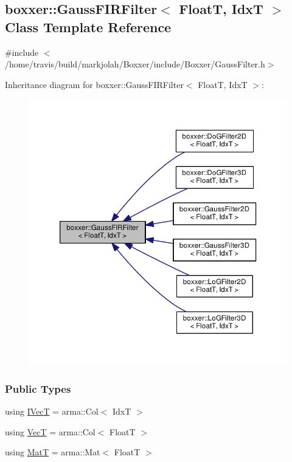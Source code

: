 \hypertarget{classboxxer_1_1GaussFIRFilter}{}\subsection{boxxer\+:\+:Gauss\+F\+I\+R\+Filter$<$ FloatT, IdxT $>$ Class Template Reference}
\label{classboxxer_1_1GaussFIRFilter}


{\ttfamily \#include $<$/home/travis/build/markjolah/\+Boxxer/include/\+Boxxer/\+Gauss\+Filter.\+h$>$}



Inheritance diagram for boxxer\+:\+:Gauss\+F\+I\+R\+Filter$<$ FloatT, IdxT $>$\+:\nopagebreak
\begin{figure}[H]
\begin{center}
\leavevmode
\includegraphics[width=333pt]{classboxxer_1_1GaussFIRFilter__inherit__graph}
\end{center}
\end{figure}
\subsubsection*{Public Types}
\begin{DoxyCompactItemize}
\item 
using \hyperlink{classboxxer_1_1GaussFIRFilter_a0083c8c9ab6032dd458b4dc93852c2b8}{I\+VecT} = arma\+::\+Col$<$ IdxT $>$
\item 
using \hyperlink{classboxxer_1_1GaussFIRFilter_aafe2049df690ad8c3617c39810e78bbe}{VecT} = arma\+::\+Col$<$ FloatT $>$
\item 
using \hyperlink{classboxxer_1_1GaussFIRFilter_a83cf4c7f4782f69918c0e0883fff5412}{MatT} = arma\+::\+Mat$<$ FloatT $>$
\end{DoxyCompactItemize}
